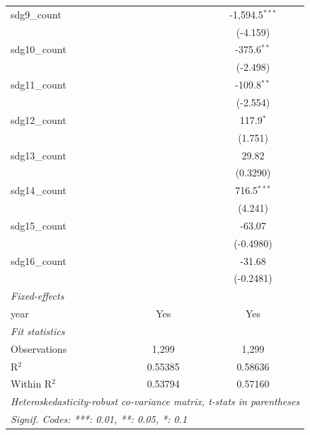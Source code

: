 \begin{tabular}{lcc}
   sdg9\_count       &                & -1,594.5$^{***}$\\   
                     &                & (-4.159)\\   
   sdg10\_count      &                & -375.6$^{**}$\\   
                     &                & (-2.498)\\   
   sdg11\_count      &                & -109.8$^{**}$\\   
                     &                & (-2.554)\\   
   sdg12\_count      &                & 117.9$^{*}$\\   
                     &                & (1.751)\\   
   sdg13\_count      &                & 29.82\\   
                     &                & (0.3290)\\   
   sdg14\_count      &                & 716.5$^{***}$\\   
                     &                & (4.241)\\   
   sdg15\_count      &                & -63.07\\   
                     &                & (-0.4980)\\   
   sdg16\_count      &                & -31.68\\   
                     &                & (-0.2481)\\   
   \midrule
   \emph{Fixed-effects}\\
   year              & Yes            & Yes\\  
   \midrule
   \emph{Fit statistics}\\
   Observations      & 1,299          & 1,299\\  
   R$^2$             & 0.55385        & 0.58636\\  
   Within R$^2$      & 0.53794        & 0.57160\\  
   \midrule \midrule
   \multicolumn{3}{l}{\emph{Heteroskedasticity-robust co-variance matrix, t-stats in parentheses}}\\
   \multicolumn{3}{l}{\emph{Signif. Codes: ***: 0.01, **: 0.05, *: 0.1}}\\
\end{tabular}
\par\endgroup


